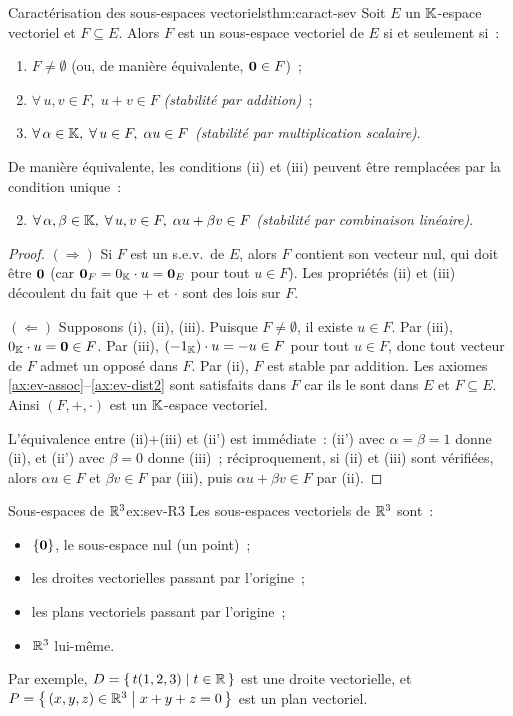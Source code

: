 \begin{theorem}{Caractérisation des sous-espaces vectoriels}{thm:caract-sev}
  Soit $E$ un ${\mathbb{K}}$-espace vectoriel et $F\subseteq E$. Alors $F$ est
  un sous-espace vectoriel de $E$ si et seulement si~:
  \begin{enumerate}[label=(\roman*)]
    \item $F\neq\emptyset$ (ou, de manière équivalente, $\mathbf{0}\in F$)~;
    \item $\forall\, u,v\in F,\; u+v\in F$ \emph{(stabilité par addition)}~;
    \item $\forall\, \alpha\in{\mathbb{K}},\;\forall\, u\in F,\; \alpha u\in F$
      \emph{(stabilité par multiplication scalaire)}.
  \end{enumerate}
  De manière équivalente, les conditions (ii) et (iii) peuvent être
  remplacées par la condition unique~:
  \begin{enumerate}[label=(\roman*')]
    \setcounter{enumi}{1}
    \item $\forall\, \alpha,\beta\in{\mathbb{K}},\;\forall\, u,v\in F,\;
      \alpha u + \beta v\in F$
      \emph{(stabilité par combinaison linéaire)}.
  \end{enumerate}
\end{theorem}

\begin{proof}
  $(\Rightarrow)$ Si $F$ est un s.e.v.\ de $E$, alors $F$ contient son
  vecteur nul, qui doit être $\mathbf{0}$ (car $\mathbf{0}_F = 0_{\mathbb{K}}\cdot u =
  \mathbf{0}_E$ pour tout $u\in F$). Les propriétés (ii) et (iii) découlent
  du fait que $+$ et $\cdot$ sont des lois sur $F$.

  $(\Leftarrow)$ Supposons (i), (ii), (iii). Puisque $F\neq\emptyset$,
  il existe $u\in F$. Par (iii), $0_{\mathbb{K}}\cdot u = \mathbf{0}\in F$. Par
  (iii), $(-1_{\mathbb{K}})\cdot u = -u\in F$ pour tout $u\in F$, donc tout
  vecteur de $F$ admet un opposé dans $F$. Par (ii), $F$ est stable
  par addition. Les axiomes \ref{ax:ev-assoc}--\ref{ax:ev-dist2} sont
  satisfaits dans $F$ car ils le sont dans $E$ et $F\subseteq E$.
  Ainsi $(F,+,\cdot)$ est un ${\mathbb{K}}$-espace vectoriel.

  L'équivalence entre (ii)+(iii) et (ii') est immédiate~: (ii') avec
  $\alpha=\beta=1$ donne (ii), et (ii') avec $\beta=0$ donne (iii)~;
  réciproquement, si (ii) et (iii) sont vérifiées, alors $\alpha u\in F$
  et $\beta v\in F$ par (iii), puis $\alpha u+\beta v\in F$ par (ii).
\end{proof}

\begin{example}{Sous-espaces de ${\mathbb{R}}^3$}{ex:sev-R3}
  Les sous-espaces vectoriels de ${\mathbb{R}}^3$ sont~:
  \begin{itemize}
    \item $\left\{\mathbf{0}\right\}$, le sous-espace nul (un point)~;
    \item les droites vectorielles passant par l'origine~;
    \item les plans vectoriels passant par l'origine~;
    \item ${\mathbb{R}}^3$ lui-même.
  \end{itemize}
  Par exemple, $D=\left\{\,t(1,2,3)\;\middle|\;t\in{\mathbb{R}}\,\right\}$ est une droite
  vectorielle, et $P=\left\{\,(x,y,z)\in{\mathbb{R}}^3\;\middle|\;x+y+z=0\,\right\}$ est un plan
  vectoriel.
\end{example}

